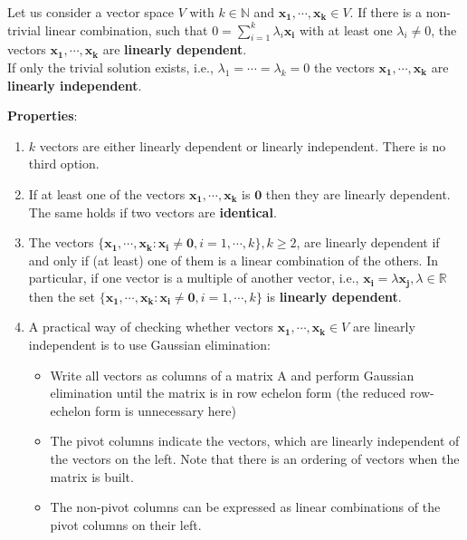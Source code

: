 Let us consider a vector space $V$ with $k \in \mathbb{N}$ and $\mathbf{x_1, \cdots, x_k} \in V$. If there is a non-trivial linear combination, such that $0 = \displaystyle\sum^k_{i=1} \lambda_i\mathbf{x_i}$ with at least one $\lambda_i \neq 0$, the vectors $\mathbf{x_1, \cdots, x_k}$ are \textbf{linearly dependent}. \\If only the trivial solution exists, i.e., $\lambda_1 = \cdots = \lambda_k = 0$ the vectors $\mathbf{x_1, \cdots, x_k}$ are \textbf{linearly independent}.

\vspace{0.3cm}
\noindent\textbf{Properties}:
\begin{enumerate}
    \item $k$ vectors are either linearly dependent or linearly independent. There is no third option.

    \item If at least one of the vectors $\mathbf{x_1, \cdots, x_k}$ is $\mathbf{0}$ then they are linearly dependent. The same holds if two vectors are \textbf{identical}.

    \item The vectors $\{\mathbf{x_1, \cdots, x_k} : \mathbf{x_i} \neq \mathbf{0}, i = 1, \cdots, k\}, k \geq 2$, are linearly dependent if and only if (at least) one of them is a linear combination of the others. In particular, if one vector is a multiple of another vector, i.e., $\mathbf{x_i} = \lambda\mathbf{x_j} , \lambda \in \mathbb{R}$ then the set $\{\mathbf{x_1, \cdots, x_k} : \mathbf{x_i} \neq \mathbf{0}, i = 1, \cdots, k\}$ is \textbf{linearly dependent}.

    \item A practical way of checking whether vectors $\mathbf{x_1, \cdots, x_k} \in V$ are linearly independent is to use Gaussian elimination: 
    \begin{itemize}
        \item Write all vectors as columns of a matrix A and perform Gaussian elimination until the matrix is in row echelon form (the reduced row-echelon form is unnecessary here)
        
        \item The pivot columns indicate the vectors, which are linearly independent of the vectors on the left. Note that there is an ordering of vectors when the matrix is built.

        \item The non-pivot columns can be expressed as linear combinations of the pivot columns on their left.


\end{itemize}
\end{enumerate}
